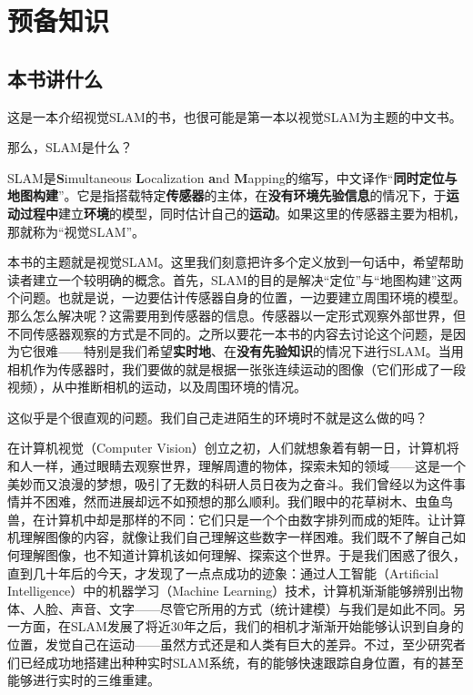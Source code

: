 \chapter{预备知识}
\section{本书讲什么}

这是一本介绍视觉SLAM的书，也很可能是第一本以视觉SLAM为主题的中文书。

那么，SLAM是什么？

SLAM是\textbf{S}imultaneous \textbf{L}ocalization \textbf{a}nd \textbf{M}apping的缩写，中文译作“\textbf{同时定位与地图构建}”\textsuperscript{\cite{Liu2016}}。它是指搭载特定\textbf{传感器}的主体，在\textbf{没有环境先验信息}的情况下，于\textbf{运动过程中}建立\textbf{环境}的模型，同时估计自己的\textbf{运动}\textsuperscript{\cite{Davison2007}}。如果这里的传感器主要为相机，那就称为“视觉SLAM”。

本书的主题就是视觉SLAM。这里我们刻意把许多个定义放到一句话中，希望帮助读者建立一个较明确的概念。首先，SLAM的目的是解决“定位”与“地图构建”这两个问题。也就是说，一边要估计传感器自身的位置，一边要建立周围环境的模型。那么怎么解决呢？这需要用到传感器的信息。传感器以一定形式观察外部世界，但不同传感器观察的方式是不同的。之所以要花一本书的内容去讨论这个问题，是因为它很难——特别是我们希望\textbf{实时地}、在\textbf{没有先验知识}的情况下进行SLAM。当用相机作为传感器时，我们要做的就是根据一张张连续运动的图像（它们形成了一段视频），从中推断相机的运动，以及周围环境的情况。

这似乎是个很直观的问题。我们自己走进陌生的环境时不就是这么做的吗？

在计算机视觉（Computer Vision）创立之初，人们就想象着有朝一日，计算机将和人一样，通过眼睛去观察世界，理解周遭的物体，探索未知的领域——这是一个美妙而又浪漫的梦想，吸引了无数的科研人员日夜为之奋斗\textsuperscript{\cite{Hartley2003}}。我们曾经以为这件事情并不困难，然而进展却远不如预想的那么顺利。我们眼中的花草树木、虫鱼鸟兽，在计算机中却是那样的不同：它们只是一个个由数字排列而成的矩阵。让计算机理解图像的内容，就像让我们自己理解这些数字一样困难。我们既不了解自己如何理解图像，也不知道计算机该如何理解、探索这个世界。于是我们困惑了很久，直到几十年后的今天，才发现了一点点成功的迹象：通过人工智能（Artificial Intelligence）中的机器学习（Machine Learning）技术，计算机渐渐能够辨别出物体、人脸、声音、文字——尽管它所用的方式（统计建模）与我们是如此不同。另一方面，在SLAM发展了将近30年之后，我们的相机才渐渐开始能够认识到自身的位置，发觉自己在运动——虽然方式还是和人类有巨大的差异。不过，至少研究者们已经成功地搭建出种种实时SLAM系统，有的能够快速跟踪自身位置，有的甚至能够进行实时的三维重建。

